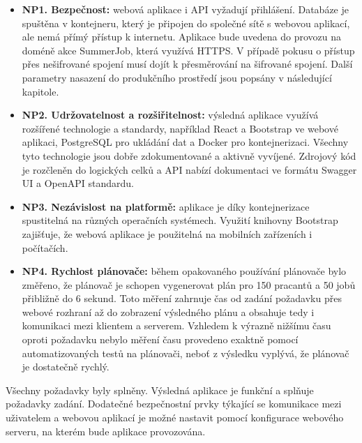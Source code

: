 \begin{itemize}
  \item \textbf{NP1. Bezpečnost:} webová aplikace i API vyžadují přihlášení. Databáze je spuštěna v kontejneru, který je připojen do společné sítě s webovou aplikací,
  ale nemá přímý přístup k internetu. Aplikace bude uvedena do provozu na doméně akce SummerJob, která využívá HTTPS. V případě pokusu o přístup přes nešifrované spojení
  musí dojít k přesměrování na šifrované spojení. Další parametry nasazení do produkčního prostředí jsou popsány v následující kapitole.
  \item \textbf{NP2. Udržovatelnost a rozšiřitelnost:} výsledná aplikace využívá rozšířené technologie a standardy, například React a Bootstrap ve webové aplikaci,
  PostgreSQL pro ukládání dat a Docker pro kontejnerizaci. Všechny tyto technologie jsou dobře zdokumentované a aktivně vyvíjené. Zdrojový kód je rozčleněn do logických celků
  a API nabízí dokumentaci ve formátu Swagger UI a OpenAPI standardu.
  \item \textbf{NP3. Nezávislost na platformě:} aplikace je díky kontejnerizace spustitelná na různých operačních systémech. Využití knihovny Bootstrap zajišťuje,
  že webová aplikace je použitelná na mobilních zařízeních i počítačích.
  \item \textbf{NP4. Rychlost plánovače:} během opakovaného používání plánovače bylo změřeno, že plánovač je schopen vygenerovat plán pro 150 pracantů a 50 jobů přibližně do 6 sekund.
  Toto měření zahrnuje čas od zadání požadavku přes webové rozhraní až do zobrazení výsledného plánu a obsahuje tedy i komunikaci mezi klientem a serverem. Vzhledem k výrazně 
  nižšímu času oproti požadavku nebylo měření času provedeno exaktně pomocí automatizovaných testů na plánovači, neboť z výsledku vyplývá, že plánovač je dostatečně rychlý.
\end{itemize}

Všechny požadavky byly splněny. Výsledná aplikace je funkční a splňuje požadavky zadání. Dodatečné bezpečnostní prvky týkající se komunikace mezi uživatelem
a webovou aplikací je možné nastavit pomocí konfigurace webového serveru, na kterém bude aplikace provozována.

